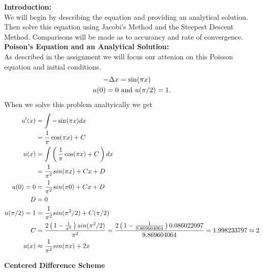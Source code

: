 \documentclass[12pt,a4paper]{report}
\begin{document}
\noindent\textbf{Introduction:}\\

	We will begin by describing the equation and providing an analytical solution.  Then solve this equation using Jacobi's Method and the Steepest Descent Method.  Comparisons will be made as to accurancy and rate of convergence.\\
	
\noindent\textbf{Poison's Equation and an Analytical Solution:}\\

As described in the assignment we will focus our attenion on this Poisson equation and initial conditions.
\begin{align*}
	-\Delta x &= \sin(\pi x)\\
	u(0) = 0 &\text{ and } u(\pi/2)=1.
\end{align*}When we solve this problem analtyically we get
\begin{align*}
	u'(x) &= \int -\sin(\pi x) dx \\
	&= \frac{1}{\pi}\cos(\pi x)+C \\
	u(x) &= \int \left (\, \frac{1}{\pi}\cos(\pi x)+C \,\right ) dx \\
	&= \frac{1}{\pi^2}sin(\pi x) + Cx + D \\
	u(0) = 0 &= \frac{1}{\pi^2}sin(\pi 0) + Cx + D \\
	D &= 0 \\
	u(\pi/2) =1 &= \frac{1}{\pi^2}sin(\pi^2/2) + C(\pi/2) \\
	C &= \frac{2\left (\, 1-\frac{1}{\pi^2} \,\right )sin(\pi^2/2)}{\pi^2}=\frac{2\left (\, 1-\frac{1}{9.869604064} \,\right )0.086022097}{9.869604064} = 1.998233797 \approx 2 \\
	u(x) &\approx \frac{1}{\pi^2}sin(\pi x) + 2x \\
\end{align*}

\noindent\textbf{Centered Difference Scheme}\\
\end{document}
